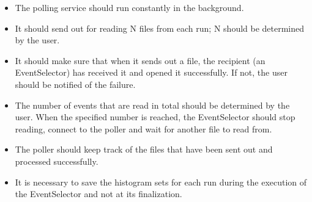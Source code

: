 \begin{itemize}
\item The polling service should run constantly in the background.\par 
\item It should send out for reading N files from each run; N should be determined by the user.\par
\item It should make sure that when it sends out a file, the recipient (an EventSelector) has received it and opened it successfully. If not, the user should be notified of the failure.\par
\item The number of events that are read in total should be determined by the user. When the specified number is reached, the EventSelector should stop reading, connect to the poller and wait for another file to read from.\par
\item The poller should keep track of the files that have been sent out and processed successfully.\par
\item It is necessary to save the histogram sets for each run during the execution of the EventSelector and not at its finalization.\par
\end{itemize}


